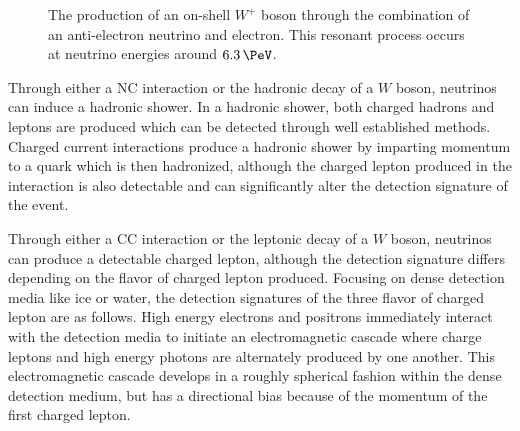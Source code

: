 \begin{figure}
	\centering
	\caption{The production of an on-shell $W^+$ boson through the combination of an anti-electron neutrino and electron.
	This resonant process occurs at neutrino energies around $\SI{6.3}\PeV$.}
	\label{fig:glashow}
\end{figure}

Through either a NC interaction or the hadronic decay of a $W$ boson, neutrinos can induce a hadronic shower.
In a hadronic shower, both charged hadrons and leptons are produced which can be detected through well established methods.
Charged current interactions produce a hadronic shower by imparting momentum to a quark which is then hadronized, although the charged lepton produced in the interaction is also detectable and can significantly alter the detection signature of the event.

Through either a CC interaction or the leptonic decay of a $W$ boson, neutrinos can produce a detectable charged lepton, although the detection signature differs depending on the flavor of charged lepton produced.
Focusing on dense detection media like ice or water, the detection signatures of the three flavor of charged lepton are as follows.
High energy electrons and positrons immediately interact with the detection media to initiate an electromagnetic cascade where charge leptons and high energy photons are alternately produced by one another.
This electromagnetic cascade develops in a roughly spherical fashion within the dense detection medium, but has a directional bias because of the momentum of the first charged lepton.

